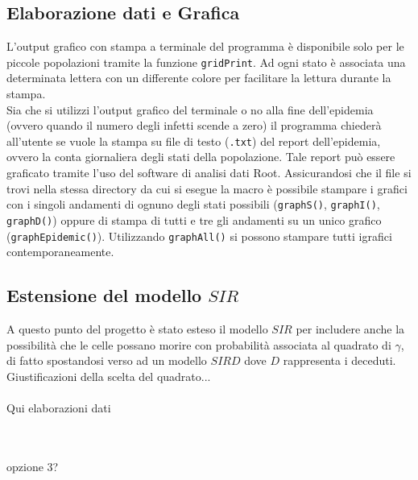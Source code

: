 \documentclass[a4paper]{article}
\begin{document}
\subsection{Elaborazione dati e Grafica}
L'output grafico con stampa a terminale del programma è disponibile solo per le piccole popolazioni tramite la funzione \texttt{gridPrint}. Ad ogni stato è associata una determinata lettera con un differente colore per facilitare la lettura durante la stampa. \\
Sia che si utilizzi l'output grafico del terminale o no alla fine dell'epidemia (ovvero quando il numero degli infetti scende a zero) il programma chiederà all'utente se vuole la stampa su file di testo (\texttt{.txt}) del report dell'epidemia, ovvero la conta giornaliera degli stati della popolazione. Tale report può essere graficato tramite l'uso del software di analisi dati Root. Assicurandosi che il file si trovi nella stessa directory da cui si esegue la macro è possibile stampare i grafici con i singoli andamenti di ognuno degli stati possibili (\texttt{graphS()}, \texttt{graphI()}, \texttt{graphD()}) oppure di stampa di tutti e tre gli andamenti su un unico grafico (\texttt{graphEpidemic()}). Utilizzando \texttt{graphAll()} si possono stampare tutti igrafici contemporaneamente.
\subsection{Estensione del modello $SIR$}
A questo punto del progetto è stato esteso il modello $SIR$ per includere anche la possibilità che le celle possano morire con probabilità associata al quadrato di $\gamma$, di fatto spostandosi verso ad un modello $SIRD$ dove $D$ rappresenta i deceduti.\\
Giustificazioni della scelta del quadrato...\\ \\
Qui elaborazioni dati

\\ \\opzione 3?
\end{document}
